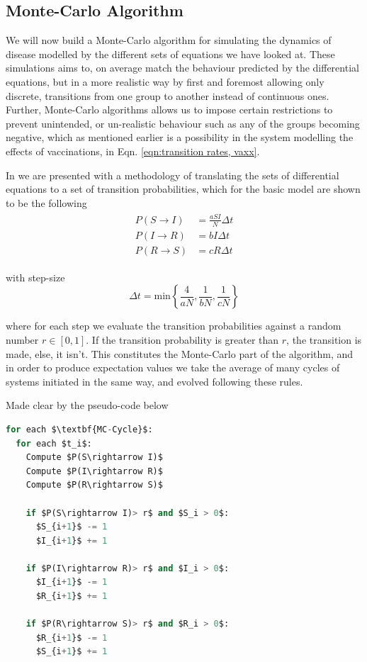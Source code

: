 \documentclass[10pt,showpacs,preprintnumbers,amsmath,amssymb,nofootinbib,aps,prl,twocolumn,groupedaddress,superscriptaddress,showkeys]{revtex4-1}
\begin{document}
  \subsection{Monte-Carlo Algorithm}
    We will now build a Monte-Carlo algorithm for simulating the dynamics of disease modelled by the different sets of equations we have looked at. These simulations aims to, on average match the behaviour predicted by the differential equations, but in a more realistic way by first and foremost allowing only discrete, transitions from one group to another instead of continuous ones. Further, Monte-Carlo algorithms allows us to  impose certain restrictions to prevent unintended, or un-realistic behaviour such as any of the groups becoming negative, which as mentioned earlier is a possibility in the system modelling the effects of vaccinations, in Eqn. \ref{eqn:transition rates, vaxx}.

    In \textcite{project5} we are presented with a methodology of translating the sets of differential equations to a set of transition probabilities, which for the basic model are shown to be the following
    \begin{align}
      \begin{split}
        P(S\rightarrow I) &= \frac{aSI}{N}\Delta t \\
        P(I\rightarrow R) &= bI\Delta t \\
        P(R\rightarrow S) &= cR\Delta t
        \label{eqn:basic probabilities}
      \end{split}
    \end{align}

    with step-size
    \begin{equation}
      \Delta t = \text{min}\left\{ \frac{4}{aN}, \frac{1}{bN}, \frac{1}{cN} \right\}
      \label{enq:basic dt}
    \end{equation}

     where for each step we evaluate the transition probabilities against a random number $r\in[0,1]$. If the transition probability is greater than $r$, the transition is made, else, it isn't. This constitutes the Monte-Carlo part of the algorithm, and in order to produce expectation values we take the average of many cycles of systems initiated in the same way, and evolved following these rules. 

     Made clear by the pseudo-code below
\begin{lstlisting}[mathescape=true, language=python, title=SIRS Monte-Carlo]
for each $\textbf{MC-Cycle}$:
  for each $t_i$:
    Compute $P(S\rightarrow I)$
    Compute $P(I\rightarrow R)$
    Compute $P(R\rightarrow S)$

    if $P(S\rightarrow I)> r$ and $S_i > 0$:
      $S_{i+1}$ -= 1
      $I_{i+1}$ += 1

    if $P(I\rightarrow R)> r$ and $I_i > 0$:
      $I_{i+1}$ -= 1
      $R_{i+1}$ += 1

    if $P(R\rightarrow S)> r$ and $R_i > 0$:
      $R_{i+1}$ -= 1
      $S_{i+1}$ += 1
\end{lstlisting}
  
\end{document}

